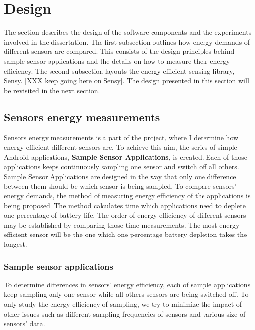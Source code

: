 \section{Design}
\label{s:design}
\hspace{10pt} The section describes the design of the software components and the experiments involved in the dissertation. The first subsection outlines how energy demands of different sensors are compared. This consists of the design principles behind sample sensor applications and the details on how to measure their energy efficiency. The second subsection layouts the energy efficient sensing library, Sensy. [XXX keep going here on Sensy]. The design presented in this section will be revisited in the next section.

\subsection{Sensors energy measurements}
\label{s:design:measurements}
\hspace{10pt} Sensors energy measurements is a part of the project, where I determine how energy efficient different sensors are. To achieve this aim, the series of simple Android applications, \textbf{Sample Sensor Applications},  is created. Each of those applications keeps continuously sampling one sensor and switch off all others. Sample Sensor Applications are designed in the way that only one difference between them should be which sensor is being sampled. To compare sensors' energy demands, the method of measuring energy efficiency of the applications is being proposed. The method calculates time which applications need to deplete one percentage of battery life. The order of energy efficiency of different sensors may be established by comparing those time measurements. The most energy efficient sensor will be the one which one percentage battery depletion takes the longest. 

\subsubsection{Sample sensor applications}
\label{s:design:measurements:sampleapps}
\hspace{10pt} To determine differences in sensors' energy efficiency, each of sample applications keep sampling only one sensor while all others sensors are being switched off. To only study the energy efficiency of sampling, we try to minimize the impact of other issues such as different sampling frequencies of sensors and various size of sensors' data.

